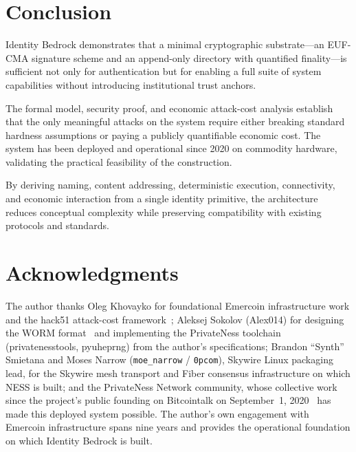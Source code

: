 \documentclass[11pt,a4paper]{article}
\begin{document}
\section{Conclusion}

Identity Bedrock demonstrates that a minimal cryptographic substrate---an
EUF-CMA signature scheme and an append-only directory with quantified
finality---is sufficient not only for authentication but for enabling a full
suite of system capabilities without introducing institutional trust anchors.

The formal model, security proof, and economic attack-cost analysis establish
that the only meaningful attacks on the system require either breaking standard
hardness assumptions or paying a publicly quantifiable economic cost.  The
system has been deployed and operational since 2020 on commodity hardware,
validating the practical feasibility of the construction.

By deriving naming, content addressing, deterministic execution, connectivity,
and economic interaction from a single identity primitive, the architecture
reduces conceptual complexity while preserving compatibility with existing
protocols and standards.

\section*{Acknowledgments}

The author thanks Oleg Khovayko for foundational Emercoin infrastructure
work and the hack51 attack-cost framework~\cite{hack51}; Aleksej Sokolov
(Alex014) for designing the WORM format~\cite{worm} and implementing the
PrivateNess toolchain (privatenesstools, pyuheprng) from the author's
specifications; Brandon ``Synth'' Smietana and Moses Narrow
(\texttt{moe\_narrow} / \texttt{0pcom}), Skywire Linux packaging lead, for
the Skywire mesh transport and Fiber consensus infrastructure on which NESS
is built; and the PrivateNess Network community, whose collective work since
the project's public founding on Bitcointalk on September~1,
2020~\cite{bitcointalk} has made this deployed system possible.  The author's
own engagement with Emercoin infrastructure spans nine years and provides the
operational foundation on which Identity Bedrock is built.
\end{document}
